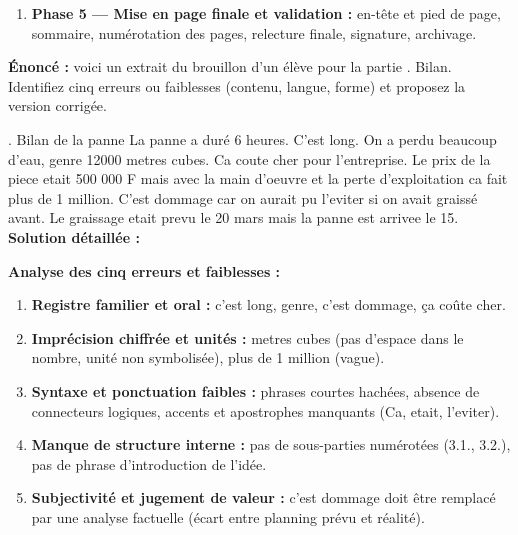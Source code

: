 \documentclass[11pt]{article}
\begin{document}
\begin{methode}
\begin{enumerate}
\begin{itemize}
            \item \textbf{Typographie :} majuscules aux entités, italique pour les titres de documents, espaces dans les nombres (\num{12000} m\textsuperscript{3}), numérotation décimale alignée.
            \item \textbf{Cohésion :} vérifier les chaînes de référence (antécédents des pronoms clairs).
        \end{itemize}
        \item \textbf{Phase 5 — Mise en page finale et validation :} en-tête et pied de page, sommaire, numérotation des pages, relecture finale, signature, archivage.
    \end{enumerate}
\end{methode}

\begin{exoresolu}
    \textbf{Énoncé :} voici un extrait du brouillon d'un élève pour la partie . Bilan\fg. Identifiez cinq erreurs ou faiblesses (contenu, langue, forme) et proposez la version corrigée.

    . Bilan de la panne
    La panne a duré 6 heures. C'est long. On a perdu beaucoup d'eau, genre 12000 metres cubes. Ca coute cher pour l'entreprise. Le prix de la piece etait 500 000 F mais avec la main d'oeuvre et la perte d'exploitation ca fait plus de 1 million. C'est dommage car on aurait pu l'eviter si on avait graissé avant. Le graissage etait prevu le 20 mars mais la panne est arrivee le 15.\fg
    \tcblower
    \textbf{Solution détaillée :}

    \textbf{Analyse des cinq erreurs et faiblesses :}
    \begin{enumerate}
        \item \textbf{Registre familier et oral :} \og c'est long\fg, \og genre\fg, \og c'est dommage\fg, \og ça coûte cher\fg.
        \item \textbf{Imprécision chiffrée et unités :}  metres cubes\fg{} (pas d'espace dans le nombre, unité non symbolisée), \og plus de 1 million\fg{} (vague).
        \item \textbf{Syntaxe et ponctuation faibles :} phrases courtes hachées, absence de connecteurs logiques, accents et apostrophes manquants (\og Ca\fg, \og etait\fg, \og l'eviter\fg).
        \item \textbf{Manque de structure interne :} pas de sous-parties numérotées (3.1., 3.2.), pas de phrase d'introduction de l'idée.
        \item \textbf{Subjectivité et jugement de valeur :} \og c'est dommage\fg{} doit être remplacé par une analyse factuelle (écart entre planning prévu et réalité).
    \end{enumerate}


\end{exoresolu}
\end{document}
